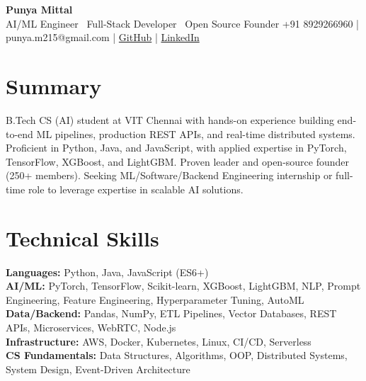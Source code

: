 \documentclass[10pt, letterpaper]{article}
\begin{document}
\pagestyle{empty}
\begin{center}
    \textbf{\Huge Punya Mittal} \\
    \vspace{2pt}
    \small AI/ML Engineer \textperiodcentered\ Full-Stack Developer \textperiodcentered\ Open Source Founder
    \vspace{4pt}
    \faPhone +91 8929266960 \quad | \quad \faEnvelope punya.m215@gmail.com \quad | \quad \faGithub \href{https://github.com/PunyaMittal}{GitHub} \quad | \quad \faLinkedin \href{https://linkedin.com/in/punyamittal}{LinkedIn}
    \vspace{4pt}
\end{center}

\section*{Summary}
B.Tech CS (AI) student at VIT Chennai with hands-on experience building end-to-end ML pipelines, production REST APIs, and real-time distributed systems. Proficient in Python, Java, and JavaScript, with applied expertise in PyTorch, TensorFlow, XGBoost, and LightGBM. Proven leader and open-source founder (250+ members). Seeking ML/Software/Backend Engineering internship or full-time role to leverage expertise in scalable AI solutions.

\section*{Technical Skills}
\textbf{Languages:} Python, Java, JavaScript (ES6+) \\
\textbf{AI/ML:} PyTorch, TensorFlow, Scikit-learn, XGBoost, LightGBM, NLP, Prompt Engineering, Feature Engineering, Hyperparameter Tuning, AutoML \\
\textbf{Data/Backend:} Pandas, NumPy, ETL Pipelines, Vector Databases, REST APIs, Microservices, WebRTC, Node.js \\
\textbf{Infrastructure:} AWS, Docker, Kubernetes, Linux, CI/CD, Serverless \\
\textbf{CS Fundamentals:} Data Structures, Algorithms, OOP, Distributed Systems, System Design, Event-Driven Architecture
\end{document}
